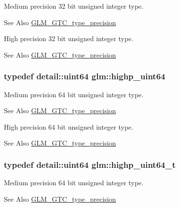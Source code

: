 Medium precision 32 bit unsigned integer type. \begin{DoxySeeAlso}{See Also}
\hyperlink{group__gtc__type__precision}{G\-L\-M\-\_\-\-G\-T\-C\-\_\-type\-\_\-precision}
\end{DoxySeeAlso}
High precision 32 bit unsigned integer type. \begin{DoxySeeAlso}{See Also}
\hyperlink{group__gtc__type__precision}{G\-L\-M\-\_\-\-G\-T\-C\-\_\-type\-\_\-precision} 
\end{DoxySeeAlso}
\hypertarget{group__gtc__type__precision_ga8079c653e20cda03d34b99de629a7b09}{
\subsubsection[{highp\-\_\-uint64}]{\setlength{\rightskip}{0pt plus 5cm}typedef detail\-::uint64 {\bf glm\-::highp\-\_\-uint64}}}\label{group__gtc__type__precision_ga8079c653e20cda03d34b99de629a7b09}
Medium precision 64 bit unsigned integer type. \begin{DoxySeeAlso}{See Also}
\hyperlink{group__gtc__type__precision}{G\-L\-M\-\_\-\-G\-T\-C\-\_\-type\-\_\-precision}
\end{DoxySeeAlso}
High precision 64 bit unsigned integer type. \begin{DoxySeeAlso}{See Also}
\hyperlink{group__gtc__type__precision}{G\-L\-M\-\_\-\-G\-T\-C\-\_\-type\-\_\-precision} 
\end{DoxySeeAlso}
\hypertarget{group__gtc__type__precision_ga6e66f40c5909bfc872b068187fa6029e}{
\subsubsection[{highp\-\_\-uint64\-\_\-t}]{\setlength{\rightskip}{0pt plus 5cm}typedef detail\-::uint64 {\bf glm\-::highp\-\_\-uint64\-\_\-t}}}\label{group__gtc__type__precision_ga6e66f40c5909bfc872b068187fa6029e}
Medium precision 64 bit unsigned integer type. \begin{DoxySeeAlso}{See Also}
\hyperlink{group__gtc__type__precision}{G\-L\-M\-\_\-\-G\-T\-C\-\_\-type\-\_\-precision}
\end{DoxySeeAlso}
